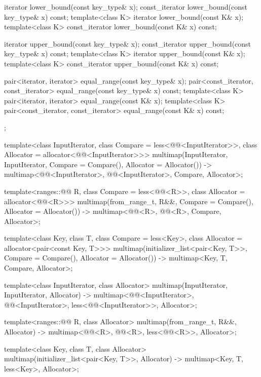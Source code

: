 \begin{codeblock}
{{    iterator       lower_bound(const key_type& x);
    const_iterator lower_bound(const key_type& x) const;
    template<class K> iterator       lower_bound(const K& x);
    template<class K> const_iterator lower_bound(const K& x) const;

    iterator       upper_bound(const key_type& x);
    const_iterator upper_bound(const key_type& x) const;
    template<class K> iterator       upper_bound(const K& x);
    template<class K> const_iterator upper_bound(const K& x) const;

    pair<iterator, iterator>               equal_range(const key_type& x);
    pair<const_iterator, const_iterator>   equal_range(const key_type& x) const;
    template<class K>
      pair<iterator, iterator>             equal_range(const K& x);
    template<class K>
      pair<const_iterator, const_iterator> equal_range(const K& x) const;
  };

  template<class InputIterator, class Compare = less<@@<InputIterator>>,
           class Allocator = allocator<@@<InputIterator>>>
    multimap(InputIterator, InputIterator, Compare = Compare(), Allocator = Allocator())
      -> multimap<@@<InputIterator>, @@<InputIterator>,
                  Compare, Allocator>;

  template<ranges::@@ R, class Compare = less<@@<R>>,
           class Allocator = allocator<@@<R>>>
    multimap(from_range_t, R&&, Compare = Compare(), Allocator = Allocator())
      -> multimap<@@<R>, @@<R>, Compare, Allocator>;

  template<class Key, class T, class Compare = less<Key>,
           class Allocator = allocator<pair<const Key, T>>>
    multimap(initializer_list<pair<Key, T>>, Compare = Compare(), Allocator = Allocator())
      -> multimap<Key, T, Compare, Allocator>;

  template<class InputIterator, class Allocator>
    multimap(InputIterator, InputIterator, Allocator)
      -> multimap<@@<InputIterator>, @@<InputIterator>,
                  less<@@<InputIterator>>, Allocator>;

  template<ranges::@@ R, class Allocator>
    multimap(from_range_t, R&&, Allocator)
      -> multimap<@@<R>, @@<R>, less<@@<R>>, Allocator>;

  template<class Key, class T, class Allocator>
    multimap(initializer_list<pair<Key, T>>, Allocator)
      -> multimap<Key, T, less<Key>, Allocator>;
}
\end{codeblock}%
%

